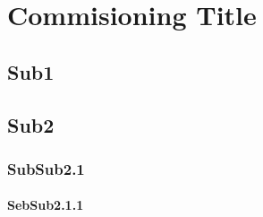 

\chapter{Commisioning Title}

\label{Label for title}

\section{Sub1}
\section{Sub2}
\subsection{SubSub2.1}
\subsubsection{SebSub2.1.1}